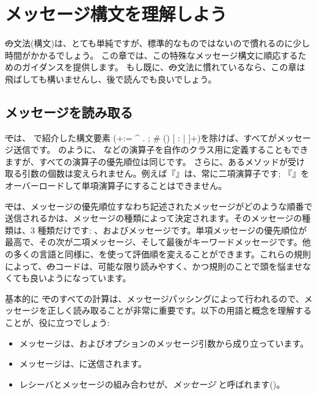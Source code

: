 \documentclass[a4paper,10pt,twoside]{book}
\begin{document}
	\renewcommand{\nnbb}[2]{} %
	\sloppy
\fi
\chapter{メッセージ構文を理解しよう}

\st の文法(構文)は、とても単純ですが、標準的なものではないので慣れるのに少し時間がかかるでしょう。
この章では、この特殊なメッセージ構文に順応するためのガイダンスを提供します。
もし既に、\st の文法に慣れているなら、この章は飛ばしても構いませんし、後で読んでも良いでしょう。

\section{メッセージを読み取る}

\st では、 で紹介した構文要素 (\ct+:= ^ . ; # () {} [ : | ]+)を除けば、すべてがメッセージ送信です。
 のように、\ct{+} などの演算子を自作のクラス用に定義することもできますが、すべての演算子の優先順位は同じです。
さらに、あるメソッドが受け取る引数の個数は変えられません。例えば『\ct{-}』は、常に二項演算子です; 『\ct{-}』をオーバーロードして単項演算子にすることはできません。

\st では、メッセージの優先順位すなわち記述されたメッセージがどのような順番で送信されるかは、メッセージの種類によって決定されます。そのメッセージの種類は、3 種類だけです: 、およびメッセージです。単項メッセージの優先順位が最高で、その次が二項メッセージ、そして最後がキーワードメッセージです。他の多くの言語と同様に、を使って評価順を変えることができます。これらの規則によって、\st のコードは、可能な限り読みやすく、かつ規則のことで頭を悩ませなくても良いようになっています。

基本的に \st でのすべての計算は、メッセージパッシングによって行われるので、メッセージを正しく読み取ることが非常に重要です。以下の用語と概念を理解することが、役に立つでしょう:

\begin{itemize}
  \item メッセージは、およびオプションのメッセージ引数から成り立っています。
  \item メッセージは、に送信されます。
  \item レシーバとメッセージの組み合わせが、\emph{メッセージ} と呼ばれます()。
\end{itemize}
\end{document}
